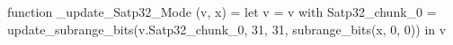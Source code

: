 function _update_Satp32_Mode (v, x) = let v = { v with Satp32_chunk_0 = update_subrange_bits(v.Satp32_chunk_0, 31, 31, subrange_bits(x, 0, 0)) } in
  v
